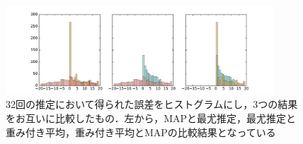 \begin{figure}[htbp]
  \centering
    \includegraphics[width=10cm]{fig/result_hist.pdf}
  \caption{32回の推定において得られた誤差をヒストグラムにし，3つの結果をお互いに比較したもの．左から，MAPと最尤推定，最尤推定と重み付き平均，重み付き平均とMAPの比較結果となっている}
  \label{fig:result_hist}
\end{figure}

